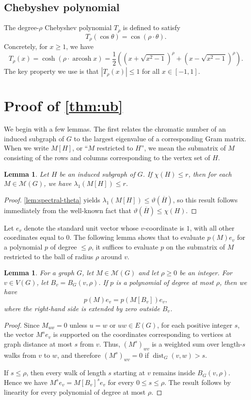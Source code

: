 \documentclass[reqno]{amsart}
\newtheorem{lemma}[theorem]{Lemma}
\theoremstyle{remark}
\theoremstyle{definition}
\numberwithin{theorem}{section}
\renewcommand{\le}{\leqslant}
\renewcommand{\ge}{\geqslant}
\newcommand{\dist}{\operatorname{dist}}
\newcommand{\lpr}[1]{\left(#1\right)}
\newcommand{\arcosh}{\operatorname{arcosh}}
\newcommand{\ov}[1]{\overline{#1}}
\begin{document}
\subsection{Chebyshev polynomial}
The degree-$\rho$ Chebyshev polynomial $T_\rho$ is defined to satisfy
\[T_\rho(\cos \theta)=\cos(\rho\cdot\theta).\]
Concretely, for $x\ge 1$, we have
\[T_\rho(x)=\cosh\lpr{\rho\cdot \arcosh x}=\frac{1}{2}\left(\left(x+\sqrt{x^2-1}\right)^\rho+\left(x-\sqrt{x^2-1}\right)^\rho\right).\]
The key property we use is that $|T_\rho(x)|\le 1$ for all $x\in [-1,1]$.

\section{Proof of \cref{thm:ub}}
\label{sec:ub}

We begin with a few lemmas. The first relates the chromatic number of an induced subgraph of $G$ to the largest eigenvalue of a corresponding Gram matrix. When we write $M[H]$, or ``$M$ restricted to $H$'', we mean the submatrix of $M$ consisting of the rows and columns corresponding to the vertex set of $H$.

\begin{lemma}\label{lem:local-r}
Let $H$ be an induced subgraph of $G$. If $\chi(H)\le r$, then for each $M\in\mathcal M(G)$, we have $\lambda_1(M[H])\le r$.
\end{lemma}

\begin{proof}
    \cref{lem:spectral-theta} yields $\lambda_1(M[H])\le \vartheta(\ov H)$, so this result follows immediately from the well-known fact that $\vartheta(\ov H)\le \chi(H)$.
\end{proof}

Let $e_v$ denote the standard unit vector whose $v$-coordinate is $1$, with all other coordinates equal to $0$. The following lemma shows that to evaluate $p(M)e_v$ for a polynomial $p$ of degree $\le \rho$, it suffices to evaluate $p$ on the submatrix of $M$ restricted to the ball of radius $\rho$ around $v$.

\begin{lemma}\label{lem:poly-local}
For a graph $G$, let $M\in\mathcal M(G)$ and let $\rho\ge 0$ be an integer. For $v\in V(G)$, let $B_v=B_G(v,\rho)$.
If $p$ is a polynomial of degree at most $\rho$, then we have
\[p(M)e_v=p(M[B_v])e_v,\]
where the right-hand side is extended by zero outside $B_v$.
\end{lemma}

\begin{proof}
Since $M_{uw}=0$ unless $u=w$ or $uw\in E(G)$, for each positive integer $s$, the vector $M^s e_v$ is supported on the coordinates corresponding to vertices at graph distance at most $s$ from $v$. Thus, $(M^s)_{wv}$ is a weighted sum over length-$s$ walks from $v$ to $w$, and therefore $(M^s)_{wv}=0$ if $\dist_G(v,w)>s$.

If $s\le \rho$, then every walk of length $s$ starting at $v$ remains inside $B_G(v,\rho)$.  Hence we have $M^s e_v=M[B_v]^s e_v$ for every $0\le s\le \rho$. The result follows by linearity for every polynomial of degree at most $\rho$.
\end{proof}
\end{document}
